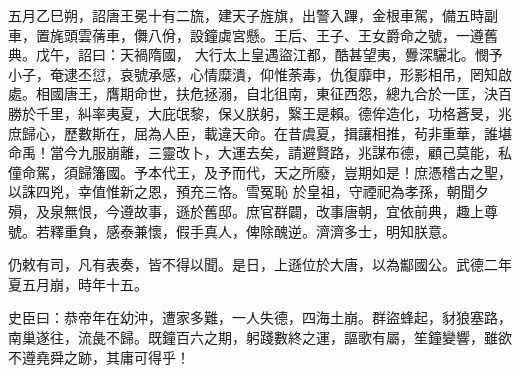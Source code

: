 \begin{pinyinscope}
 五月乙巳朔，詔唐王冕十有二旒，建天子旌旗，出警入蹕，金根車駕，備五時副車，置旄頭雲蒨車，儛八佾，設鐘虡宮懸。王后、王子、王女爵命之號，一遵舊典。戊午，詔曰：天禍隋國，
 大行太上皇遇盜江都，酷甚望夷，釁深驪北。憫予小子，奄逮丕愆，哀號承感，心情糜潰，仰惟荼毒，仇復靡申，形影相吊，罔知啟處。相國唐王，膺期命世，扶危拯溺，自北徂南，東征西怨，總九合於一匡，決百勝於千里，糾率夷夏，大庇氓黎，保乂朕躬，繄王是賴。德侔造化，功格蒼旻，兆庶歸心，歷數斯在，屈為人臣，載違天命。在昔虞夏，揖讓相推，茍非重華，誰堪命禹！當今九服崩離，三靈改卜，大運去矣，請避賢路，兆謀布德，顧己莫能，私僮命駕，須歸籓國。予本代王，及予而代，天之所廢，豈期如是！庶憑稽古之聖，以誅四兇，幸值惟新之恩，預充三恪。雪冤恥
 於皇祖，守禋祀為孝孫，朝聞夕殞，及泉無恨，今遵故事，遜於舊邸。庶官群闢，改事唐朝，宜依前典，趣上尊號。若釋重負，感泰兼懷，假手真人，俾除醜逆。濟濟多士，明知朕意。



 仍敕有司，凡有表奏，皆不得以聞。是日，上遜位於大唐，以為酅國公。武德二年夏五月崩，時年十五。



 史臣曰：恭帝年在幼沖，遭家多難，一人失德，四海土崩。群盜蜂起，豺狼塞路，南巢遂往，流彘不歸。既鐘百六之期，躬踐數終之運，謳歌有屬，笙鐘變響，雖欲不遵堯舜之跡，其庸可得乎！



\end{pinyinscope}